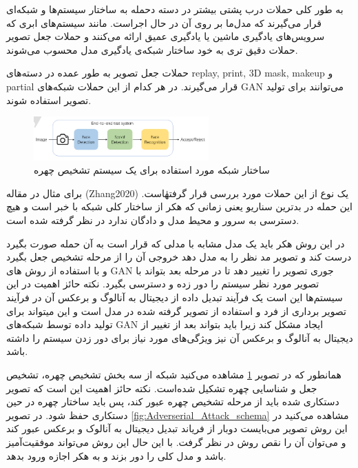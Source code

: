 به طور کلی حملات درب پشتی بیشتر در دسته دحمله به ساختار سیستم‌ها و شبکه‌ای قرار می‌گیرند که مدل‌ما بر روی آن در حال اجراست. مانند سیستم‌های ابری که سرویس‌های یادگیری ماشین یا یادگیری عمیق ارائه می‌کنند و حملات جعل تصویر حملات دقیق تری به خود ساختار شبکه‌‌ی یادگیری مدل محسوب می‌شوند.

حملات جعل تصویر به طور عمده در دسته‌های replay, print, 3D mask, makeup و partial قرار می‌گیرند. در هر کدام از این حملات شبکه‌های GAN می‌توانند برای تولید تصویر استفاده شوند. 

\begin{figure}[h]
	\centering
	\includegraphics[width=0.6\textwidth]{img/report/Adversarial_attack_model}
	\caption{ساختار شبکه مورد استفاده برای یک سیستم تشخیص چهره\cite{Zhang2020}}
	\label{fig:Adverserial_Attack}
	\centering
\end{figure}

\newpage
برای مثال در مقاله (Zhang2020)
\cite{Zhang2020}
یک نوع از این حملات مورد بررسی قرار گرفتهٰاست. این حمله در بدترین سناریو یعنی زمانی که هکر از ساختار کلی شبکه با خبر است و هیچ دسترسی به سرور و محیط مدل و دادگان ندارد در نظر گرفته شده است.

در این روش هکر باید یک مدل مشابه با مدلی که قرار است به آن حمله صورت بگیرد درست کند و تصویر مد نظر را به مدل دهد خروجی آن را از مرحله تشخیص جعل بگیرد و با استفاده از روش های GAN جوری تصویر را تغییر دهد تا در مرحله بعد بتواند با تصویر مورد نظر سیستم را دور زده و دسترسی بگیرد. نکته حائز اهمیت در این سیستم‌ها این است یک فرآیند تبدیل داده از دیجیتال به آنالوگ و برعکس آن در فرآیند تصویر برداری از فرد و استفاده از تصویر گرفته شده در مدل است و این میتواند برای تولید داده توسط شبکه‌های GAN ایجاد مشکل کند زیرا باید بتواند بعد از تغییر از دیجیتال به آنالوگ و برعکس آن نیز ویژگی‌های مورد نیاز برای دور زدن سیستم را داشته باشد.

همانطور که در تصویر 
\ref{fig:Adverserial_Attack}
مشاهده می‌کنید شبکه از سه بخش تشخیص چهره، تشخیص جعل و شناسایی چهره تشکیل شده‌است. نکته حائز اهمیت این است که تصویر دستکاری شده باید از مرحله تشخیص چهره عبور کند، پس باید ساختار چهره در حین دستکاری حفظ شود. در تصویر
\ref{fig:Adverserial_Attack_schema}
مشاهده می‌کنید در این روش تصویر می‌بایست دوبار از فرياند تبدیل دیجیتال به آنالوک و برعکس عبور کند و می‌توان آن را نقص روش در نظر گرفت. با این‌ حال این روش می‌تواند موفقیت‌آمیز باشد و مدل کلی را دور بزند و به هکر اجازه ورود بدهد.


